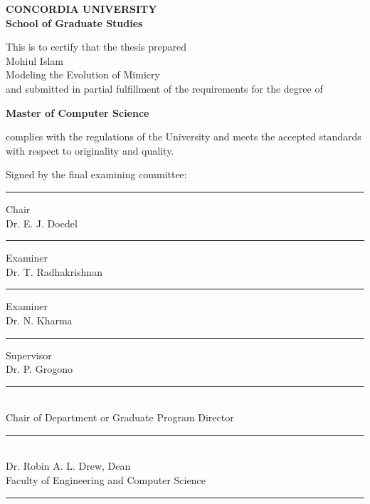 \begin{titlepage}
\begin{center}
\Large \textbf{CONCORDIA UNIVERSITY}\\
\Large \textbf{School of Graduate Studies}\\[1cm]
\end{center}
This is to certify that the thesis prepared\\
 Mohiul Islam\\
  Modeling the Evolution of Mimicry\\
and submitted in partial fulfillment of the requirements for the degree of
\begin{center}
\small \textbf{Master of Computer Science}\\
\end{center}
complies with the regulations of the University and meets the accepted standards with respect to originality and quality.\\[0.4cm]
\begin{spacing}{1}
\noindent
Signed by the final examining committee:\\[0.8cm]
\makebox[5cm][l]{} \rule{7cm}{0.1mm} Chair\\ 
\makebox[5cm][l]{} Dr. E. J. Doedel\\[0.8cm]
\makebox[5cm][l]{} \rule{7cm}{0.1mm} Examiner\\ 
\makebox[5cm][l]{} Dr. T. Radhakrishnan\\[0.8cm]
\makebox[5cm][l]{} \rule{7cm}{0.1mm} Examiner\\ 
\makebox[5cm][l]{} Dr. N. Kharma\\[0.8cm]
\makebox[5cm][l]{} \rule{7cm}{0.1mm} Supervisor\\ 
\makebox[5cm][l]{} Dr. P. Grogono\\[0.8cm]
 \rule{10cm}{0.1mm}\\ 
\makebox[5cm][l]{} Chair of Department or Graduate Program Director\\[0.8cm]
\makebox[5cm][l]{} \rule{10cm}{0.1mm}\\ 
\makebox[5cm][l]{} Dr. Robin A. L. Drew, Dean \\
\makebox[5cm][l]{} Faculty of Engineering and Computer Science\\[0.8cm]
 \rule{7cm}{0.1mm}
\end{spacing}
\end{titlepage}